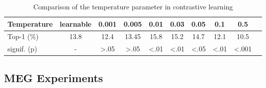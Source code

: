 \begin{table}[h]
  \caption{Comparison of the temperature parameter in contrastive learning}
  \label{tab:7}
  \small
  \centering
\begin{tabular}{lccccccccc}
   \toprule
   Temperature & learnable & 0.001 & 0.005 & 0.01 & 0.03 & 0.05 & 0.1 & 0.5 \\
   \midrule
   Top-1 (\%) & 13.8 & 12.4 & 13.45 & 15.8 & 15.2 & 14.7 & 12.1 & 10.5 \\
   signif. (p) & - & >.05 & >.05 & <.01 & <.01 & <.05 & <.01	& <.001 \\
   \bottomrule
\end{tabular}
\end{table}

\subsection{MEG Experiments}
\label{sec:appendA5}

